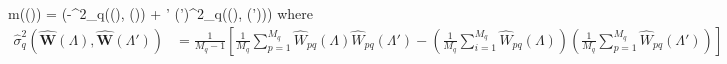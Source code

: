 \beq
m((\Lambda)) = \exp\left(-\hat{\sigma}^2_q\left((\Lambda), (\Lambda)\right) + \Lambda' (\Lambda')\hat{\sigma}^2_q\left((\Lambda), (\Lambda')\right)\right)
\eeq
where
\begin{align}
\hat{\sigma}^2_q\left(\hat{\bm W}(\Lambda), \hat{\bm W}(\Lambda')\right) &= \frac{1}{M_q-1}\left[\frac{1}{M_q}\sum_{p=1}^{M_q}\hat{W}_{pq}(\Lambda)\hat{W}_{pq}(\Lambda') - \left(\frac{1}{M_q}\sum_{i=1}^{M_q}\hat{W}_{pq}(\Lambda)\right)\left(\frac{1}{M_q}\sum_{p=1}^{M_q}\hat{W}_{pq}(\Lambda')\right)\right]
\end{align}